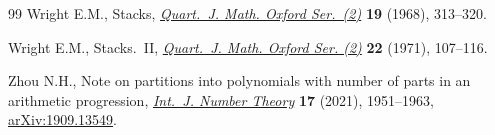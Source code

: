 \documentclass[10pt,a4paper]{amsart}
\numberwithin{equation}{section}
\begin{document}
\begin{thebibliography}{99}
Wright E.M., Stacks, \href{https://doi.org/10.1093/qmath/19.1.313}{\textit{Quart.~J. Math. Oxford Ser.~(2)}} \textbf{19}
 (1968), 313--320.

Wright E.M., Stacks.~{II}, \href{https://doi.org/10.1093/qmath/22.1.107}{\textit{Quart.~J. Math. Oxford Ser. (2)}} \textbf{22}
 (1971), 107--116.

Zhou N.H., Note on partitions into polynomials with number of parts in an
 arithmetic progression, \href{https://doi.org/10.1142/S1793042121500718}{\textit{Int.~J. Number Theory}} \textbf{17} (2021),
 1951--1963, \href{https://arxiv.org/abs/1909.13549}{arXiv:1909.13549}.

\end{thebibliography}
\end{document}

